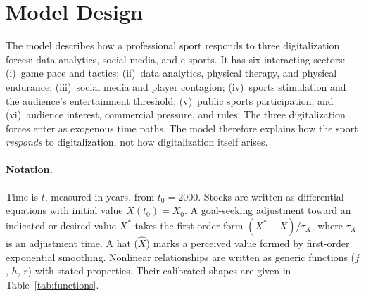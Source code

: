 %
%
%

\section{Model Design}
\label{sec:model}

The model describes how a professional sport responds to three
digitalization forces: data analytics, social media, and e-sports. It
has six interacting sectors: (i)~game pace and tactics; (ii)~data
analytics, physical therapy, and physical endurance; (iii)~social media
and player contagion; (iv)~sports stimulation and the audience's
entertainment threshold; (v)~public sports participation; and
(vi)~audience interest, commercial pressure, and rules. The three
digitalization forces enter as exogenous time paths. The model
therefore explains how the sport \emph{responds} to digitalization, not
how digitalization itself arises.

\paragraph{Notation.}
Time is $t$, measured in years, from $t_0 = 2000$. Stocks are written
as differential equations with initial value $X(t_0) = X_0$. A
goal-seeking adjustment toward an indicated or desired value $X^{*}$
takes the first-order form $(X^{*} - X)/\tau_X$, where $\tau_X$ is an
adjustment time. A hat ($\hat{X}$) marks a perceived value formed by
first-order exponential smoothing. Nonlinear relationships are written
as generic functions ($f$, $h$, $r$) with stated properties. Their
calibrated shapes are given in Table~\ref{tab:functions}.

